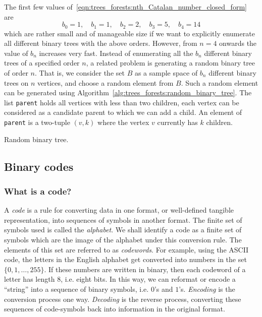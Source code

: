 The first few values
of~\eqref{eqn:trees_forests:nth_Catalan_number_closed_form} are
\[
b_0 = 1,\quad
b_1 = 1,\quad
b_2 = 2,\quad
b_3 = 5,\quad
b_4 = 14
\]
which are rather small and of manageable size if we want to explicitly
enumerate all different binary trees with the above orders. However,
from $n = 4$ onwards the value of $b_n$ increases very fast. Instead
of enumerating all the $b_n$ different binary trees of a specified
order $n$, a related problem is generating a random binary tree of
order $n$. That is, we consider the set $B$ as a
sample space of $b_n$ different binary
trees on $n$ vertices, and choose a random
element from $B$. Such a random element can be
generated using
Algorithm~\ref{alg:trees_forests:random_binary_tree}. The list
\texttt{parent} holds all vertices with less than two children, each
vertex can be considered as a candidate parent to which we can add a
child. An element of \texttt{parent} is a two-tuple $(v, k)$ where the
vertex $v$ currently has $k$ children.

\begin{algorithm}[!htbp]

\caption{Random binary tree.}
\label{alg:trees_forests:random_binary_tree}
\end{algorithm}



\subsection{Binary codes}



\subsubsection{What is a code?}

A \emph{code} is a rule for converting data in one format,
or well-defined tangible representation, into sequences of symbols in
another format. The finite set of symbols used is called the
\emph{alphabet}. We shall identify a code as a finite
set of symbols which are the image of the alphabet under this
conversion rule. The elements of this set are referred to as
\emph{codewords}. For example, using the
ASCII code, the letters in the
English alphabet get converted into numbers in
the set $\{0, 1, \dots, 255\}$. If these numbers are written in
binary, then each codeword of a letter has length $8$,
i.e. eight bits. In this way, we can reformat or encode a
``string'' into a sequence of binary
symbols, i.e. $0$'s and $1$'s. \emph{Encoding} is
the conversion process one way. \emph{Decoding} is the
reverse process, converting these sequences of code-symbols back into
information in the original format.

